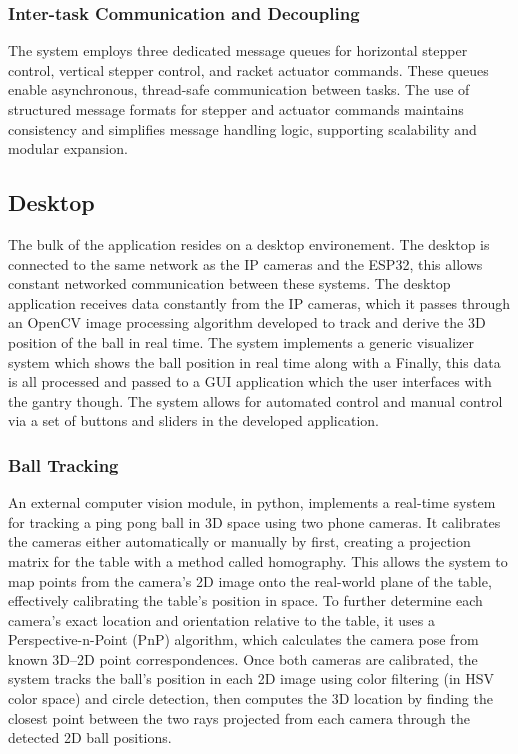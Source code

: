 \subsubsection{Inter-task Communication and Decoupling}
The system employs three dedicated message queues for horizontal stepper control, vertical stepper control, and racket actuator commands. These queues enable asynchronous, thread-safe communication between tasks. The use of structured message formats for stepper and actuator commands maintains consistency and simplifies message handling logic, supporting scalability and modular expansion.

\subsection{Desktop}
The bulk of the application resides on a desktop environement. The desktop is connected to the same network as the IP cameras and the ESP32, this allows constant networked communication between these systems. The desktop application receives data constantly from the IP cameras, which it passes through an OpenCV image processing algorithm developed to track and derive the 3D position of the ball in real time. The system implements a generic visualizer system which shows the ball position in real time along with a Finally, this data is all processed and passed to a GUI application which the user interfaces with the gantry though. The system allows for automated control and manual control via a set of buttons and sliders in the developed application.

\subsubsection{Ball Tracking}
An external computer vision module, in python, implements a real-time system for tracking a ping pong ball in 3D space using two phone cameras. It calibrates the cameras either automatically or manually by first, creating a projection matrix for the table with a method called homography. This allows the system to map points from the camera’s 2D image onto the real-world plane of the table, effectively calibrating the table’s position in space. To further determine each camera’s exact location and orientation relative to the table, it uses a Perspective-n-Point (PnP) algorithm, which calculates the camera pose from known 3D–2D point correspondences. Once both cameras are calibrated, the system tracks the ball’s position in each 2D image using color filtering (in HSV color space) and circle detection, then computes the 3D location by finding the closest point between the two rays projected from each camera through the detected 2D ball positions.

